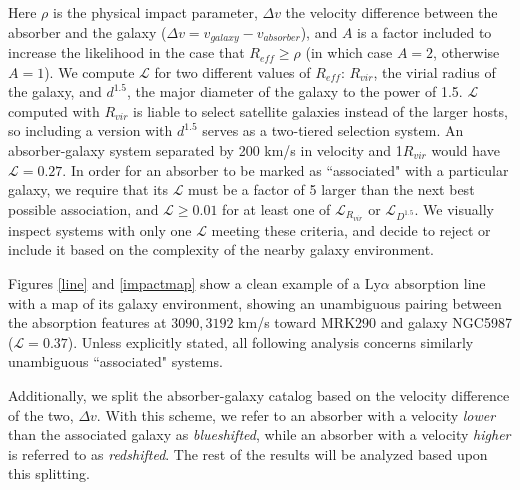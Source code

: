 \documentclass[iop]{emulateapj-rtx4}
\begin{document}
\noindent Here $\rho$ is the physical impact parameter, $\Delta v$ the velocity difference between the absorber and the galaxy ($\Delta v = v_{galaxy} - v_{absorber}$), and $A$ is a factor included to increase the likelihood in the case that $R_{eff} \geq \rho$ (in which case $A = 2$, otherwise $A = 1$). We compute $\mathcal{L}$ for two different values of $R_{eff}$: $R_{vir}$, the virial radius of the galaxy, and $d^{1.5}$, the major diameter of the galaxy to the power of 1.5. $\mathcal{L}$ computed with $R_{vir}$ is liable to select satellite galaxies instead of the larger hosts, so including a version with $d^{1.5}$ serves as a two-tiered selection system. An absorber-galaxy system separated by 200 km/s in velocity and 1$R_{vir}$ would have $\mathcal{L} = 0.27$. In order for an absorber to be marked as ``associated" with a particular galaxy, we require that its $\mathcal{L}$ must be a factor of 5 larger than the next best possible association, and $\mathcal{L} \ge 0.01$ for at least one of $\mathcal{L}_{R_{vir}}$ or $\mathcal{L}_{D^{1.5}}$. We visually inspect systems with only one $\mathcal{L}$ meeting these criteria, and decide to reject or include it based on the complexity of the nearby galaxy environment. 

Figures \ref{line} and \ref{impactmap} show a clean example of a Ly$\alpha$ absorption line with a map of its galaxy environment, showing an unambiguous pairing between the absorption features at $3090, 3192$ km/s toward MRK290 and galaxy NGC5987 ($\mathcal{L} = 0.37$). Unless explicitly stated, all following analysis concerns similarly unambiguous ``associated" systems. 

Additionally, we split the absorber-galaxy catalog based on the velocity difference of the two, $\Delta v$. With this scheme, we refer to an absorber with a velocity \textit{lower} than the associated galaxy as \textit{blueshifted}, while an absorber with a velocity \textit{higher} is referred to as \textit{redshifted}. The rest of the results will be analyzed based upon this splitting. 
\end{document}
